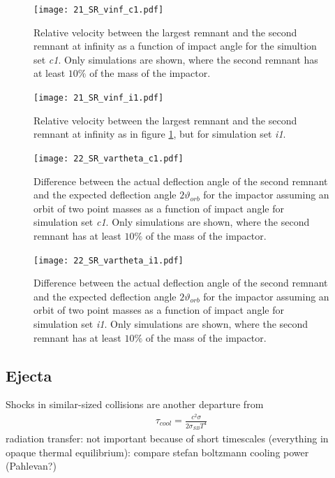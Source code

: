 \begin{landscape}

\begin{figure}[htbp]
\begin{center}
\texttt{[image: 21\_SR\_vinf\_c1.pdf]}
\caption{Relative velocity between the largest remnant and the second remnant at infinity as a function of impact angle for the simultion set \emph{c1}. Only simulations are shown, where the second remnant has at least $10\%$ of the mass of the impactor.}
\label{ch03_fig21a}
\end{center}
\end{figure}

\begin{figure}[htbp]
\begin{center}
\texttt{[image: 21\_SR\_vinf\_i1.pdf]}
\caption{Relative velocity between the largest remnant and the second remnant at infinity as in figure \ref{ch03_fig21a}, but for simulation set \emph{i1}.}
\label{ch03_fig21b}
\end{center}
\end{figure}

\begin{figure}[htbp]
\begin{center}
\texttt{[image: 22\_SR\_vartheta\_c1.pdf]}
\caption{Difference between the actual deflection angle of the second remnant and the expected deflection angle $2 \vartheta_{orb}$ for the impactor assuming an orbit of two point masses as a function of impact angle for simulation set \emph{c1}. Only simulations are shown, where the second remnant has at least $10\%$ of the mass of the impactor.}
\label{ch03_fig22a}
\end{center}
\end{figure}

\begin{figure}[htbp]
\begin{center}
\texttt{[image: 22\_SR\_vartheta\_i1.pdf]}
\caption{Difference between the actual deflection angle of the second remnant and the expected deflection angle $2 \vartheta_{orb}$ for the impactor assuming an orbit of two point masses as a function of impact angle for simulation set \emph{i1}. Only simulations are shown, where the second remnant has at least $10\%$ of the mass of the impactor.}
\label{ch03_fig22b}
\end{center}
\end{figure}
\end{landscape}


\subsection{Ejecta}
Shocks in similar-sized collisions are another departure from 
\begin{align}
\tau_{cool} = \frac{c^2 \sigma}{ 2 \sigma_{SB} T^4}
\end{align}
\cite{Thompson:1988p3451}
radiation transfer: not important because of short timescales (everything in opaque thermal equilibrium): compare stefan boltzmann cooling power (Pahlevan?)


